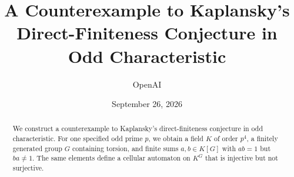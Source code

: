 \documentclass[11pt]{article}
\title{A Counterexample to Kaplansky's Direct-Finiteness Conjecture in Odd Characteristic}
\author{OpenAI}
\date{September 26, 2026}
\theoremstyle{remark}
\numberwithin{equation}{section}
\begin{document}
\maketitle
\begin{abstract}
We construct a counterexample to Kaplansky's direct-finiteness conjecture in odd characteristic. For one specified odd prime $p$, we obtain a field $K$ of order $p^4$, a finitely generated group $G$ containing torsion, and finite sums $a,b\in K[G]$ with $ab=1$ but $ba\ne1$. The same elements define a cellular automaton on $K^G$ that is injective but not surjective.
\end{abstract}







\begingroup
\raggedright


\endgroup
\end{document}
